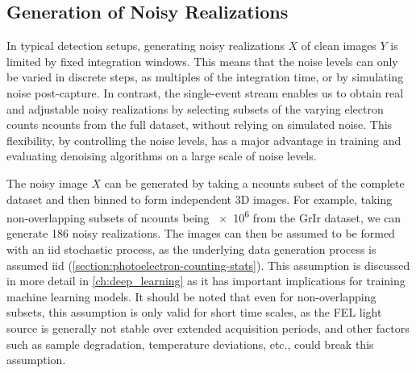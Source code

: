 \subsection{Generation of Noisy Realizations}\label{section:noisy-realizations}
In typical detection setups, generating noisy realizations $X$ of clean images $Y$ is limited by fixed integration windows. This means that the noise levels can only be varied in discrete steps, as multiples of the integration time, or by simulating noise post-capture. In contrast, the single-event stream enables us to obtain real and adjustable noisy realizations by selecting subsets of the varying electron counts \gls{ncounts} from the full dataset, without relying on simulated noise. This flexibility, by controlling the noise levels, has a major advantage in training and evaluating denoising algorithms on a large scale of noise levels.

The noisy image $X$ can be generated by taking a \gls{ncounts} subset of the complete dataset and then binned to form independent 3D images. For example, taking non-overlapping subsets of \gls{ncounts} being \num{e6} from the \gls{GrIr} dataset, we can generate \num{186} noisy realizations. The images can then be assumed to be formed with an \gls{iid} stochastic process, as the underlying data generation process is assumed \gls{iid} (\cref{section:photoelectron-counting-stats}). This assumption is discussed in more detail in \cref{ch:deep_learning} as it has important implications for training machine learning models. It should be noted that even for non-overlapping subsets, this assumption is only valid for short time scales, as the \gls{FEL} light source is generally not stable over extended acquisition periods, and other factors such as sample degradation, temperature deviations, etc., could break this assumption.


